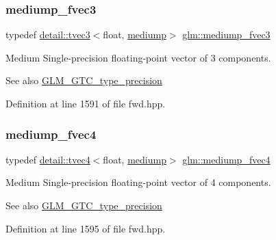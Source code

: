 \subsubsection{\texorpdfstring{mediump\+\_\+fvec3}{mediump\_fvec3}}
{\footnotesize\ttfamily typedef \hyperlink{structglm_1_1detail_1_1tvec3}{detail\+::tvec3}$<$float, \hyperlink{namespaceglm_a0f04f086094c747d227af4425893f545a6416f3ea0c9025fb21ed50c4d6620482}{mediump}$>$ \hyperlink{group__gtc__type__precision_ga710c3af5ebb05e5e863cff78affd25a6}{glm\+::mediump\+\_\+fvec3}}

Medium Single-\/precision floating-\/point vector of 3 components. \begin{DoxySeeAlso}{See also}
\hyperlink{group__gtc__type__precision}{G\+L\+M\+\_\+\+G\+T\+C\+\_\+type\+\_\+precision} 
\end{DoxySeeAlso}


Definition at line 1591 of file fwd.\+hpp.

\mbox{\label{group__gtc__type__precision_gaba16de142de00531a1598d83716c6939}} 
\subsubsection{\texorpdfstring{mediump\+\_\+fvec4}{mediump\_fvec4}}
{\footnotesize\ttfamily typedef \hyperlink{structglm_1_1detail_1_1tvec4}{detail\+::tvec4}$<$float, \hyperlink{namespaceglm_a0f04f086094c747d227af4425893f545a6416f3ea0c9025fb21ed50c4d6620482}{mediump}$>$ \hyperlink{group__gtc__type__precision_gaba16de142de00531a1598d83716c6939}{glm\+::mediump\+\_\+fvec4}}

Medium Single-\/precision floating-\/point vector of 4 components. \begin{DoxySeeAlso}{See also}
\hyperlink{group__gtc__type__precision}{G\+L\+M\+\_\+\+G\+T\+C\+\_\+type\+\_\+precision} 
\end{DoxySeeAlso}


Definition at line 1595 of file fwd.\+hpp.

\mbox{\label{group__gtc__type__precision_ga8454fc6a82c7bb787d0ac9663e08f63d}} 

